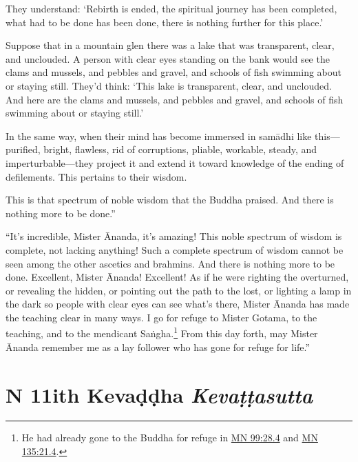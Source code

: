 \documentclass[12pt,openany]{book}%
\newcommand*{\suttatitleacronym}[1]{\smaller[2]{#1}\vspace*{.3em}}
\newcommand*{\suttatitletranslation}[1]{\linebreak{#1}}
\newcommand*{\suttatitleroot}[1]{\linebreak\smaller[2]\itshape{#1}}
\newcommand*{\tocacronym}[1]{\hspace*{-3.3em}{#1}\quad}
\newcommand*{\toctranslation}[1]{#1}
\newcommand*{\tocroot}[1]{(\textit{#1})}
\renewcommand*{\tocacronym}[1]{\hspace*{0em}{#1}\quad}%
\begin{document}
They understand: ‘Rebirth is ended, the spiritual journey has been completed, what had to be done has been done, there is nothing further for this place.’ 

Suppose that in a mountain glen there was a lake that was transparent, clear, and unclouded. A person with clear eyes standing on the bank would see the clams and mussels, and pebbles and gravel, and schools of fish swimming about or staying still. They’d think: ‘This lake is transparent, clear, and unclouded. And here are the clams and mussels, and pebbles and gravel, and schools of fish swimming about or staying still.’ 

In the same way, when their mind has become immersed in \textsanskrit{samādhi} like this—purified, bright, flawless, rid of corruptions, pliable, workable, steady, and imperturbable—they project it and extend it toward knowledge of the ending of defilements. This pertains to their wisdom. 

This is that spectrum of noble wisdom that the Buddha praised. And there is nothing more to be done.” 

“It’s incredible, Mister Ānanda, it’s amazing! This noble spectrum of wisdom is complete, not lacking anything! Such a complete spectrum of wisdom cannot be seen among the other ascetics and brahmins. And there is nothing more to be done. Excellent, Mister Ānanda! Excellent! As if he were righting the overturned, or revealing the hidden, or pointing out the path to the lost, or lighting a lamp in the dark so people with clear eyes can see what’s there, Mister Ānanda has made the teaching clear in many ways. I go for refuge to Mister Gotama, to the teaching, and to the mendicant \textsanskrit{Saṅgha}.\footnote{He had already gone to the Buddha for refuge in \href{https://suttacentral.net/mn99/en/sujato\#28.4}{MN 99:28.4} and \href{https://suttacentral.net/mn135/en/sujato\#21.4}{MN 135:21.4}. } From this day forth, may Mister Ānanda remember me as a lay follower who has gone for refuge for life.” 

%
\chapter*{{\suttatitleacronym DN 11}{\suttatitletranslation With Kevaḍḍha }{\suttatitleroot Kevaṭṭasutta}}
\addcontentsline{toc}{chapter}{\tocacronym{DN 11} \toctranslation{With Kevaḍḍha } \tocroot{Kevaṭṭasutta}}
\end{document}
